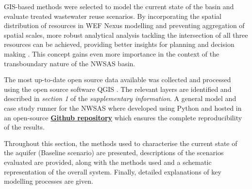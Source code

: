 GIS-based methods were selected to model the current state of the basin and evaluate treated wastewater reuse scenarios. By incorporating the spatial distribution of resources in WEF Nexus modelling and preventing aggregation of spatial scales, more robust analytical analysis tackling the intersection of all three resources can be achieved, providing better insights for planning and decision making \cite{shannakMovingTheoryPractice2018,albrechtWaterEnergyFoodNexusSystematic2018}. This concept gains even more importance in the context of the transboundary nature of the NWSAS basin.

The most up-to-date open source data available was collected and processed using the open source software QGIS \cite{QGIS2020}. The relevant layers are identified and described in \textit{section 1} of the \textit{supplementary information}. A general model and case study runner for the NWSAS where developed using Python and hosted in an open-source \href{https://github.com/camiloramirezgo/NWSAS-paper-model}{\textbf{Github repository}} which ensures the complete reproducibility of the results.

Throughout this section, the methods used to characterise the current state of the aquifer (Baseline scenario) are presented, descriptions of the scenarios evaluated are provided, along with the methods used and a schematic representation of the overall system. Finally, detailed explanations of key modelling processes are given.


